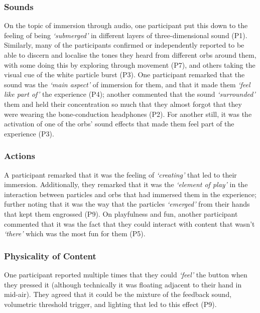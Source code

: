 \subsubsection{Sounds}\label{sec: polaris-feedback-immersion-sounds}
On the topic of immersion through audio, one participant put this down to the feeling of being \textit{`submerged'} in different layers of three-dimensional sound (P1). Similarly, many of the participants confirmed or independently reported to be able to discern and localise the tones they heard from different orbs around them, with some doing this by exploring through movement (P7), and others taking the visual cue of the white particle burst (P3). One participant remarked that the sound was the \textit{`main aspect'} of immersion for them, and that it made them \textit{`feel like part of'} the experience (P4); another commented that the sound \textit{`surrounded'} them and held their concentration so much that they almost forgot that they were wearing the bone-conduction headphones (P2). For another still, it was the activation of one of the orbs' sound effects that made them feel part of the experience (P3).

\subsubsection{Actions}\label{sec: polaris-feedback-immersion-actions}
A participant remarked that it was the feeling of \textit{`creating'} that led to their immersion. Additionally, they remarked that it was the \textit{`element of play'} in the interaction between particles and orbs that had immersed them in the experience; further noting that it was the way that the particles \textit{`emerged'} from their hands that kept them engrossed (P9). On playfulness and fun, another participant commented that it was the fact that they could interact with content that wasn't \textit{`there'} which was the most fun for them (P5).

\subsubsection{Physicality of Content}\label{sec: polaris-feedback-immersion-physicality}
One participant reported multiple times that they could \textit{`feel'} the button when they pressed it (although technically it was floating adjacent to their hand in mid-air). They agreed that it could be the mixture of the feedback sound, volumetric threshold trigger, and lighting that led to this effect (P9).

